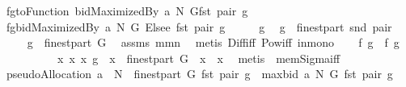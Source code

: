 \begin{isabellebody}
\isamarkupfalse%
\ {\isacharquery}f{}{\isacharequal}{\isachardoublequoteopen}{\isacharpercent}g{\isachardot}{\isacharparenleft}toFunction\ {\isacharparenleft}bidMaximizedBy\ a\ N\ G{\isacharparenright}{\isacharparenright}{\isacharparenleft}fst\ pair{\isacharcomma}\ g{\isacharparenright}{\isachardoublequoteclose}\isanewline
{}\isamarkupfalse%
\ {\isacharquery}f{}{\isacharequal}{\isachardoublequoteopen}{\isacharpercent}g{\isachardot}{\isacharparenleft}{\isacharparenleft}bidMaximizedBy\ a\ N\ G{\isacharparenright}\ Elsee\ {}{\isacharparenright}{\isacharparenleft}fst\ pair{\isacharcomma}\ g{\isacharparenright}{\isachardoublequoteclose}\isanewline
\isacommand{{\isacharbraceleft}}\isamarkupfalse%
\ \isanewline
\ \ \isamarkupfalse%
\ g\ \isamarkupfalse%
\ {\isachardoublequoteopen}g\ {\isasymin}\ finestpart\ {\isacharparenleft}snd\ pair{\isacharparenright}{\isachardoublequoteclose}\ \isamarkupfalse%
\ \isamarkupfalse%
\ \isanewline
\ \ {}{\isacharcolon}\ {\isachardoublequoteopen}g\ {\isasymin}\ finestpart\ G{\isachardoublequoteclose}\ \isamarkupfalse%
\ assms\ mm{}{}n\ \isamarkupfalse%
\ {\isacharparenleft}metis\ Diff{\isacharunderscore}iff\ Pow{\isacharunderscore}iff\ in{\isacharunderscore}mono{\isacharparenright}\isanewline
\ \ \isamarkupfalse%
\ {\isachardoublequoteopen}{\isacharquery}f{}\ g\ {\isacharequal}\ {\isacharquery}f{}\ g{\isachardoublequoteclose}\ \isanewline
\ \ \isamarkupfalse%
\ {\isacharminus}\isanewline
\ \ \ \ \isamarkupfalse%
\ {\isachardoublequoteopen}{\isasymAnd}x\ x\ {\isacharparenleft}x\ g{\isacharparenright}\ {\isasymin}\ x\ {\isasymtimes}\ finestpart\ G\ {\isasymor}\ x\ {\isasymnotin}\ x\ \isamarkupfalse%
\ {\isacharparenleft}metis\ {}\ mem{\isacharunderscore}Sigma{\isacharunderscore}iff{\isacharparenright}\ \isanewline
\ \ \ \ \isamarkupfalse%
\ {\isachardoublequoteopen}{\isacharparenleft}pseudoAllocation\ a\ {\isacharless}{\isacharbar}\ {\isacharparenleft}N\ {\isasymtimes}\ finestpart\ G{\isacharparenright}{\isacharparenright}\ {\isacharparenleft}fst\ pair{\isacharcomma}\ g{\isacharparenright}\ {\isacharequal}\ maxbid\ a\ N\ G\ {\isacharparenleft}fst\ pair{\isacharcomma}\ g{\isacharparenright}{\isachardoublequoteclose}\ \isanewline

\end{isabellebody}
